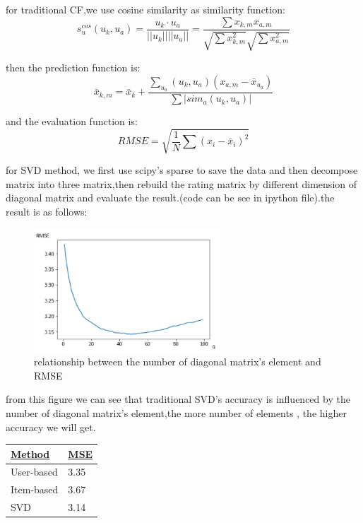 \documentclass{acmtog} %
\begin{document}
for traditional CF,we use cosine similarity as similarity function:
\begin{equation}
	s_u^{cos}(u_k,u_a)=\frac{u_k\cdot u_a}{||u_k||||u_a||}=\frac{\sum x_{k,m}x_{a,m}}{\sqrt{\sum x_{k,m}^2}\sqrt{\sum x_{a,m}^2}}
\end{equation}

then the prediction function is:
\begin{equation}
	\bar x_{k,m}=\bar x_k+\frac{\sum_{u_a}(u_k,u_a)(x_{a,m}-\bar x_{u_a})}{\sum |sim_a(u_k,u_a)|}
\end{equation}


and the evaluation function is:
\begin{equation}
	RMSE=\sqrt{\frac{1}{N}\sum (x_i-\bar x_i)^2}
\end{equation}

for SVD method, we first use scipy's sparse to save the data and then decompose matrix into three matrix,then rebuild the rating matrix by different dimension of diagonal matrix and evaluate the result.(code can be see in ipython file).the result  is as follows:
\begin{figure}[h!]
	\centering
	\includegraphics[width=7cm]{pa7}
	\caption{relationship between the number of diagonal matrix's element and RMSE}
	\label{fig:pa7}
\end{figure}

from this figure we can see that traditional SVD's accuracy is influenced by the number of diagonal matrix's element,the more number of elements , the higher accuracy we will get.
\begin{table}[h!]
	\centering
	\begin{tabular}{|l|l|}
		\hline
		{\ul \textbf{Method}} & {\ul \textbf{MSE}} \\ \hline
		User-based&3.35               \\ \hline
		Item-based&3.67                 \\ \hline
		SVD&3.14                 \\ \hline
	\end{tabular}
\end{table}
\end{document}
